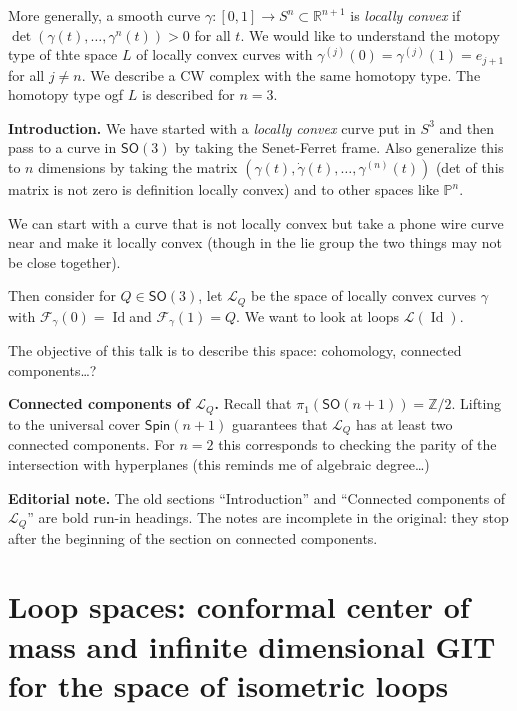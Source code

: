 More generally, a smooth curve
$\gamma:[0,1]\to S^n \subset
\mathbb{R}^{n+1}$ is \textit{locally convex}
if $\det(\gamma(t),\ldots,\gamma^n(t))>0$ for
all $t$. We would like to understand the
motopy type of thte space $L$ of locally
convex curves with
$\gamma^{(j)}(0)=\gamma^{(j)}(1)=e_{j+1}$ for
all $j \neq n$. We describe a CW complex with
the same homotopy type. The homotopy type ogf
$L$ is described for $n=3$.

\medskip\noindent
{\bf Introduction.}
We have started with a \textit{locally
convex} curve put in $S^3$ and then pass to a
curve in $\mathsf{SO}(3)$ by taking the
Senet-Ferret frame. Also generalize this to
$n$ dimensions by taking the matrix
$(\gamma(t),\dot\gamma(t),\ldots,
\gamma^{(n)}(t))$ (det of this matrix is not
zero is definition locally convex) and to
other spaces like $\mathbb{P}^n$.

We can start with a curve that is not locally
convex but take a phone wire curve near and
make it locally convex (though in the lie
group the two things may not be close
together).

Then consider for $Q \in \mathsf{SO}(3)$, let
$\mathcal{L}_{Q}$ be the space of locally
convex curves $\gamma$ with
$\mathcal{F}_\gamma(0)=\operatorname{Id}$and
$\mathcal{F}_\gamma(1)=Q$. We want to look at
loops $\mathcal{L}(\operatorname{Id})$.

The objective of this talk is to describe
this space: cohomology, connected
components…?

\medskip\noindent
{\bf Connected components of
$\mathcal{L}_Q$.}
Recall that
$\pi_{1}(\mathsf{SO}(n+1))=\mathbb{Z}/2$.
Lifting to the universal cover
$\mathsf{Spin}(n+1)$ guarantees that
$\mathcal{L}_Q$ has at least two connected
components. For $n=2$ this corresponds to
checking the parity of the intersection with
hyperplanes (this reminds me of algebraic
degree…)

\medskip\noindent
{\bf Editorial note.}
The old sections ``Introduction'' and
``Connected components of $\mathcal{L}_Q$''
are bold run-in headings. The notes are
incomplete in the original: they stop after
the beginning of the section on connected
components.


\section{Loop spaces: conformal center of
mass and infinite dimensional GIT for the
space of isometric loops}
\label{section-korshunov-loop-spaces}

